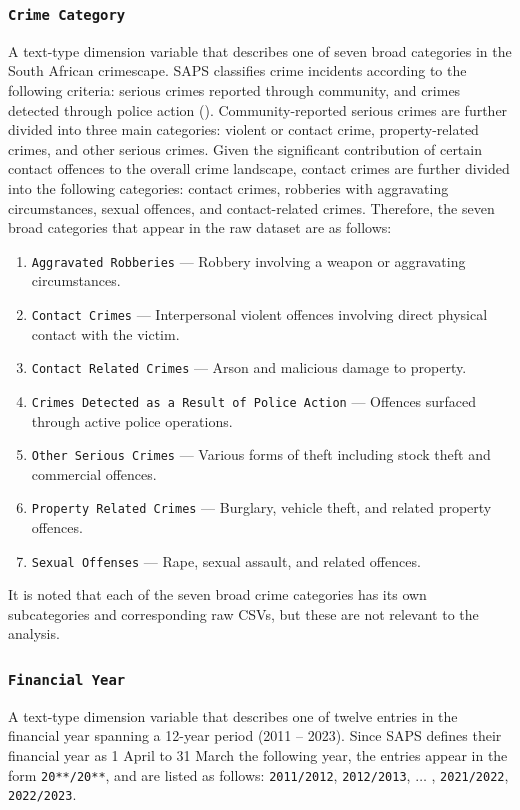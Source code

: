 \documentclass[titlepage, 12pt, oneside]{article}
\numberwithin{equation}{section}
\begin{document}
	\subsubsection*{\texttt{Crime Category}} 
	A text-type dimension variable that describes one of seven broad categories in the South African crimescape. SAPS classifies crime incidents according to the following criteria: serious crimes reported through community, and crimes detected through police action (\cite{iss}). Community-reported serious crimes are further divided into three main categories: violent or contact crime, property-related crimes, and other serious crimes. Given the significant contribution of certain contact offences to the overall crime landscape, contact crimes are further divided into the following categories: contact crimes, robberies with aggravating circumstances, sexual offences, and contact-related crimes. Therefore, the seven broad categories that appear in the raw dataset are as follows:
	\begin{enumerate}[leftmargin=*]
		\item \texttt{Aggravated Robberies} --- Robbery involving a weapon or aggravating circumstances.
		\item \texttt{Contact Crimes} --- Interpersonal violent offences involving direct physical contact with the victim.
		\item \texttt{Contact Related Crimes} --- Arson and malicious damage to property.
		\item \texttt{Crimes Detected as a Result of Police Action} --- Offences surfaced through active police operations.
		\item \texttt{Other Serious Crimes} --- Various forms of theft including stock theft and commercial offences.
		\item \texttt{Property Related Crimes} --- Burglary, vehicle theft, and related property offences.
		\item \texttt{Sexual Offenses} --- Rape, sexual assault, and related offences.
	\end{enumerate}
	It is noted that each of the seven broad crime categories has its own subcategories and corresponding raw CSVs, but these are not relevant to the analysis.
	\subsubsection*{\texttt{Financial Year}} 
	A text-type dimension variable that describes one of twelve entries in the financial year spanning a 12-year period (2011 -- 2023). Since SAPS defines their financial year as 1 April to 31 March the following year, the entries appear in the form \texttt{20**/20**}, and are listed as follows: \texttt{2011/2012}, \texttt{2012/2013}, $\ldots$ , \texttt{2021/2022}, \texttt{2022/2023}. 
\end{document}
